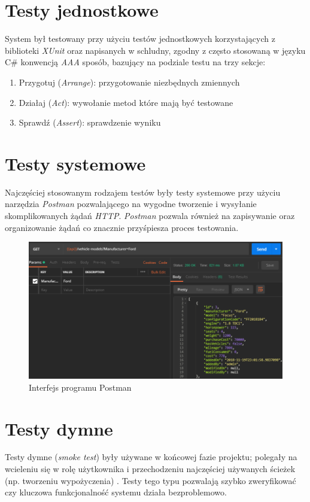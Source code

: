\documentclass[eng,printmode,openany]{mgr}
\begin{document}
\section{Testy jednostkowe}
System był testowany przy użyciu testów jednostkowych korzystających z biblioteki \textit{XUnit} oraz napisanych w schludny, zgodny z często stosowaną w języku C\# konwencją \textit{AAA} sposób, bazujący na podziale testu na trzy sekcje:
\begin{enumerate}
	\item Przygotuj (\textit{Arrange}): przygotowanie niezbędnych zmiennych
	\item Działaj (\textit{Act}): wywołanie metod które mają być testowane 
	\item Sprawdź (\textit{Assert}): sprawdzenie wyniku 
\end{enumerate}



\section{Testy systemowe}
Najczęściej stosowanym rodzajem testów były testy systemowe przy użyciu narzędzia \textit{Postman} pozwalającego na wygodne tworzenie i wysyłanie skomplikowanych żądań \textit{HTTP}. \textit{Postman} pozwala również na zapisywanie oraz organizowanie żądań co znacznie przyśpiesza proces testowania.
\begin{figure}[H]
	\centering
	\includegraphics[width=\textwidth]{images/tests_postman.png}
	\caption{Interfejs programu Postman}
\end{figure}
\section{Testy dymne}
Testy dymne (\textit{smoke test}) były używane w końcowej fazie projektu; polegały na wcieleniu się w rolę użytkownika i przechodzeniu najczęściej używanych ścieżek (np. tworzeniu wypożyczenia) . Testy tego typu pozwalają szybko zweryfikować czy kluczowa funkcjonalność systemu działa bezproblemowo.
\end{document}
